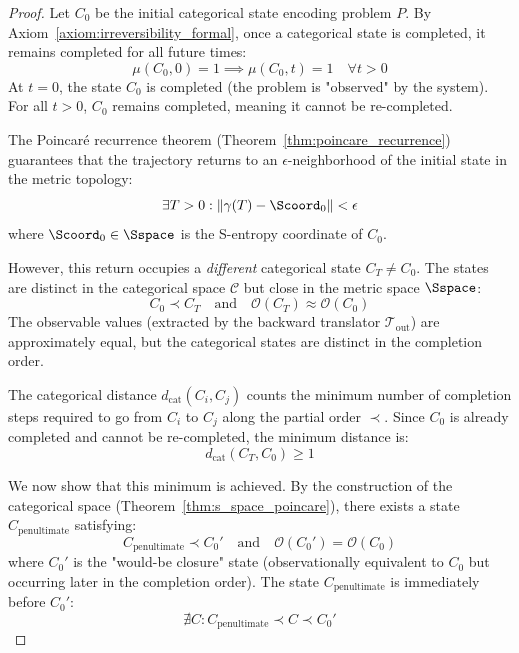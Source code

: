 \begin{proof}
Let $C_0$ be the initial categorical state encoding problem $P$. By Axiom~\ref{axiom:irreversibility_formal}, once a categorical state is completed, it remains completed for all future times:
\begin{equation}
\mu(C_0, 0) = 1 \implies \mu(C_0, t) = 1 \quad \forall t > 0
\end{equation}
At $t = 0$, the state $C_0$ is completed (the problem is "observed" by the system). For all $t > 0$, $C_0$ remains completed, meaning it cannot be re-completed.

The Poincaré recurrence theorem (Theorem~\ref{thm:poincare_recurrence}) guarantees that the trajectory returns to an $\epsilon$-neighborhood of the initial state in the metric topology:
\begin{equation}
\exists T > 0: \|\gamma(T) - \Scoord_0\| < \epsilon
\end{equation}
where $\Scoord_0 \in \Sspace$ is the S-entropy coordinate of $C_0$.

However, this return occupies a \textit{different} categorical state $C_T \neq C_0$. The states are distinct in the categorical space $\mathcal{C}$ but close in the metric space $\Sspace$:
\begin{equation}
C_0 \prec C_T \quad \text{and} \quad \mathcal{O}(C_T) \approx \mathcal{O}(C_0)
\end{equation}
The observable values (extracted by the backward translator $\mathcal{T}_{\text{out}}$) are approximately equal, but the categorical states are distinct in the completion order.

The categorical distance $d_{\text{cat}}(C_i, C_j)$ counts the minimum number of completion steps required to go from $C_i$ to $C_j$ along the partial order $\prec$. Since $C_0$ is already completed and cannot be re-completed, the minimum distance is:
\begin{equation}
d_{\text{cat}}(C_T, C_0) \geq 1
\end{equation}

We now show that this minimum is achieved. By the construction of the categorical space (Theorem~\ref{thm:s_space_poincare}), there exists a state $C_{\text{penultimate}}$ satisfying:
\begin{equation}
C_{\text{penultimate}} \prec C_0' \quad \text{and} \quad \mathcal{O}(C_0') = \mathcal{O}(C_0)
\end{equation}
where $C_0'$ is the "would-be closure" state (observationally equivalent to $C_0$ but occurring later in the completion order). The state $C_{\text{penultimate}}$ is immediately before $C_0'$:
\begin{equation}
\nexists C: C_{\text{penultimate}} \prec C \prec C_0'
\end{equation}


\end{proof}
